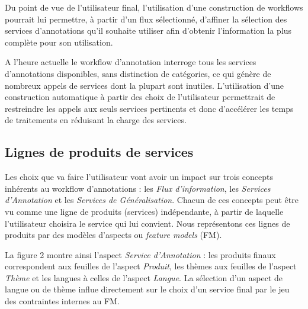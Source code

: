 \documentclass[]{easychair}
\begin{document}
Du point de vue de l'utilisateur final, l'utilisation d'une construction de workflows pourrait lui permettre, à partir d'un flux sélectionné, d'affiner la sélection des services d'annotations qu'il souhaite utiliser afin d'obtenir l'information la plus complète pour son utilisation.

A l'heure actuelle le workflow d'annotation interroge tous les services d'annotations disponibles, sans distinction de catégories, ce qui génère de nombreux appels de services dont la plupart sont inutiles. L'utilisation d'une construction automatique à partir des choix de l'utilisateur permettrait de restreindre les appels aux seuls services pertinents et donc d'accélérer les temps de traitements en réduisant la charge des services. 

\subsection{Lignes de produits de services}
Les choix que va faire l'utilisateur vont avoir un impact sur trois concepts inhérents au workflow d'annotations : les \textit{Flux d'information}, les \textit{Services d'Annotation} et les \textit{Services de Généralisation}. Chacun de ces concepts peut être vu comme une ligne de produits (services) indépendante, à partir de laquelle l'utilisateur choisira le service qui lui convient. Nous représentons ces lignes de produits par des modèles d'aspects ou \textsl{feature models} (FM).

La figure 2 montre ainsi l'aspect \textit{Service d'Annotation} : les produits finaux correspondent aux feuilles de l'aspect \textit{Produit}, les thèmes aux feuilles de l'aspect \textit{Thème} et les langues à celles de l'aspect \textit{Langue}. La sélection d'un aspect de langue ou de thème influe directement sur le choix d'un service final par le jeu des contraintes internes au FM. 


\end{document}
